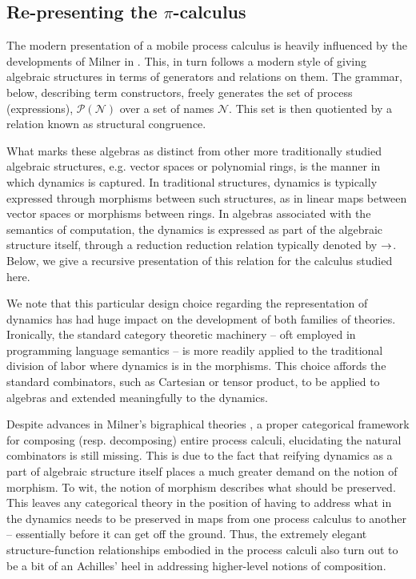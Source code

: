 \subsection{Re-presenting the $\pi$-calculus}
The modern presentation of a mobile process calculus is heavily
influenced by the developments of Milner in
\cite{FunctionsAsProcesses}. This, in turn follows a modern style of
giving algebraic structures in terms of generators and relations on
them. The grammar, below, describing term constructors, freely
generates the set of process (expressions), $\mathcal{P(N)}$ over a
set of names $\mathcal{N}$. This set is then quotiented by a relation
known as structural congruence.

What marks these algebras as distinct from other more traditionally
studied algebraic structures, e.g. vector spaces or polynomial rings,
is the manner in which dynamics is captured. In traditional
structures, dynamics is typically expressed through morphisms between
such structures, as in linear maps between vector spaces or morphisms
between rings. In algebras associated with the semantics of
computation, the dynamics is expressed as part of the algebraic
structure itself, through a reduction reduction relation typically
denoted by $\rightarrow$. Below, we give a recursive presentation of this
relation for the calculus studied here.

We note that this particular design choice regarding the
representation of dynamics has had huge impact on the development of
both families of theories. Ironically, the standard category theoretic
machinery -- oft employed in programming language semantics -- is more
readily applied to the traditional division of labor where dynamics is
in the morphisms. This choice affords the standard combinators, such
as Cartesian or tensor product, to be applied to algebras and extended
meaningfully to the dynamics.

Despite advances in Milner's bigraphical theories
\cite{DBLP:conf/popl/JensenM03}, a proper categorical framework for
composing (resp. decomposing) entire process calculi, elucidating the
natural combinators is still missing. This is due to the fact that
reifying dynamics as a part of algebraic structure itself places a
much greater demand on the notion of morphism. To wit, the notion of
morphism describes what should be preserved. This leaves any
categorical theory in the position of having to address what in the
dynamics needs to be preserved in maps from one process calculus to
another -- essentially before it can get off the ground. Thus, the
extremely elegant structure-function relationships embodied in the
process calculi also turn out to be a bit of an Achilles' heel in
addressing higher-level notions of composition.

